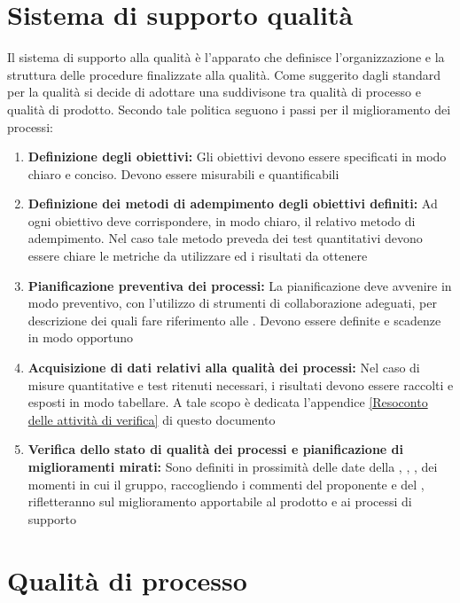 \documentclass[12pt,a4paper]{article}
\begin{document}
\section{Sistema di supporto qualità}
Il sistema di supporto alla qualità è l'apparato che definisce l'organizzazione e la struttura delle procedure finalizzate alla qualità. Come suggerito dagli standard per la qualità si decide di adottare una suddivisone tra qualità di processo e qualità di prodotto. Secondo tale politica seguono i passi per il miglioramento dei processi: 

\begin{enumerate}
	\item \textbf {Definizione degli obiettivi:} Gli obiettivi devono essere specificati in modo chiaro e conciso. Devono essere misurabili e quantificabili
	\item \textbf{Definizione dei metodi di adempimento degli obiettivi definiti:} Ad ogni obiettivo deve corrispondere, in modo chiaro, il relativo metodo di adempimento. Nel caso tale metodo preveda dei test quantitativi devono essere chiare le metriche da utilizzare ed i risultati da ottenere
	\item \textbf{Pianificazione preventiva dei processi:} La pianificazione deve avvenire in modo preventivo, con l'utilizzo di strumenti di collaborazione adeguati, per descrizione dei quali fare riferimento alle \NdP{}. Devono essere definite  e scadenze in modo opportuno
	\item \textbf{Acquisizione di dati relativi alla qualità dei processi:} Nel caso di misure quantitative e test ritenuti necessari, i risultati devono essere raccolti e esposti in modo tabellare. A tale scopo è dedicata l'appendice \ref{Resoconto delle attività di verifica} di questo documento
	\item \textbf{Verifica dello stato di qualità dei processi e pianificazione di miglioramenti mirati:}
	Sono definiti in prossimità delle date della \RR{}, \RA{}, \RP{}, \RQ{} dei momenti in cui il gruppo, raccogliendo i commenti del proponente \Zucchetti{} e del \Vardanega{}, rifletteranno sul miglioramento apportabile al prodotto e ai processi di supporto
\end{enumerate}

\newpage

\section{Qualità di processo}
\end{document}
